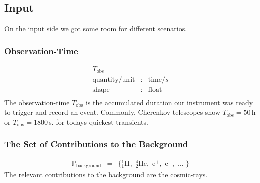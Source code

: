 \documentclass{article}%
\begin{document}
        \subsection{Input}
            On the input side we got some room for different scenarios.
        \subsubsection*{Observation-Time}
            \begin{eqnarray*}
                T_\text{obs} && \\
                \text{quantity}/\text{unit} &:& \text{time} / s\\
                \text{shape} &:& \text{float}\\
            \end{eqnarray*}
            The observation-time $T_\text{obs}$ is the accumulated duration our instrument was ready to trigger and record an event.
            Commonly, Cherenkov-telescopes show $T_\text{obs} = 50\,$h or $T_\text{obs} = 1800\,$s. for todays quickest transients.
        \subsubsection*{The Set of Contributions to the Background}
            \begin{eqnarray*}
                \mathbb{P}_\text{background} &=& \{
                {_1^1}\text{H},\,\,
                {_2^4}\text{He},\,\,
                \text{e}^{+},\,\,
                \text{e}^{-},\,\,
                \dots{}\,\,
                \}
            \end{eqnarray*}
            The relevant contributions to the background are the cosmic-rays.
\end{document}

